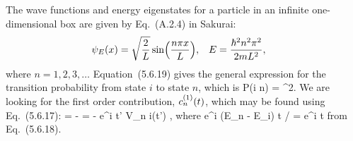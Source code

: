 \begin{solution}
	The wave functions and energy eigenstates for a particle in an infinite one-dimensional box are given by Eq.~(A.2.4) in Sakurai:
	\begin{align*}
		\psi_E(x) &= \sqrt{\frac{2}{L}} \sin(\frac{n \pi x}{L}), &
		E &= \frac{\hbar^2 n^2 \pi^2}{2 m L^2},
	\end{align*}
	where $n = 1, 2, 3, \ldots$  Equation~(5.6.19) gives the general expression for the transition probability from state $i$ to state $n$, which is
	\beq
		P(i \to n) = ^2.
	\eeq
	We are looking for the first order contribution, $c_n^{(1)}(t)$, which may be found using Eq.~(5.6.17):
	\beqn \label{cn1}
		\cnqt = - \inttot {} \dtp
		= - \inttot e^{i \omgni t'} V_{n i}(t') \dtp,
	\eeqn
	where
	\beq
		e^{i (E_n - E_i) t / \hbar} = e^{i \omgni t}
	\eeq
	from Eq.~(5.6.18).
	

\end{solution}
